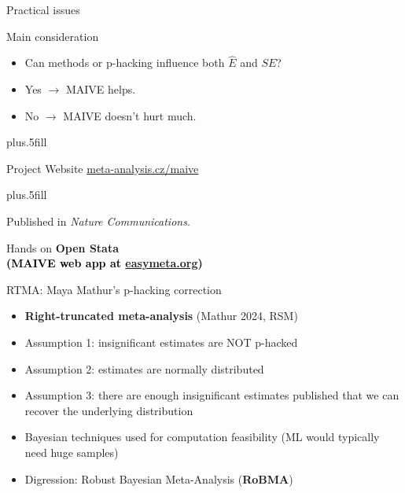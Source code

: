 \documentclass{beamer} %
\begin{document}
\begin{frame}{Practical issues}
  \begin{block}{Main consideration}
  \begin{itemize}
  \item Can methods or p-hacking influence both $\hat{E}$ and $SE$? %
	
	\item Yes $\rightarrow$ MAIVE helps. %
	
	\item No $\rightarrow$ MAIVE doesn't hurt much. %


  \end{itemize}
  \end{block}

\vskip0pt plus.5fill
    \begin{block}{Project Website}
      \href{http://www.meta-analysis.cz/maive}{meta-analysis.cz/maive}
    \end{block}
		
		\vskip0pt plus.5fill
		
		Published in \emph{Nature Communications}.
		
\end{frame}



\begin{frame}{Hands on}
  \centering
  \vfill
  {\bfseries\LARGE Open Stata \\[0.5em]
   \textcolor{black}{\normalsize (MAIVE web app at \href{https://easymeta.org}{easymeta.org})}}
  \vfill
\end{frame}






\begin{frame}{RTMA: Maya Mathur's p-hacking correction}
\begin{itemize}
	\item \textbf{Right-truncated meta-analysis} (Mathur 2024, RSM)
	\item Assumption 1: insignificant estimates are NOT p-hacked
	\item Assumption 2: estimates are normally distributed
	\item Assumption 3: there are enough insignificant estimates published that we can recover the underlying distribution
	\item Bayesian techniques used for computation feasibility (ML would typically need huge samples)
	\item Digression: Robust Bayesian Meta-Analysis (\textbf{RoBMA})
\end{itemize}
\end{frame}
\end{document}

